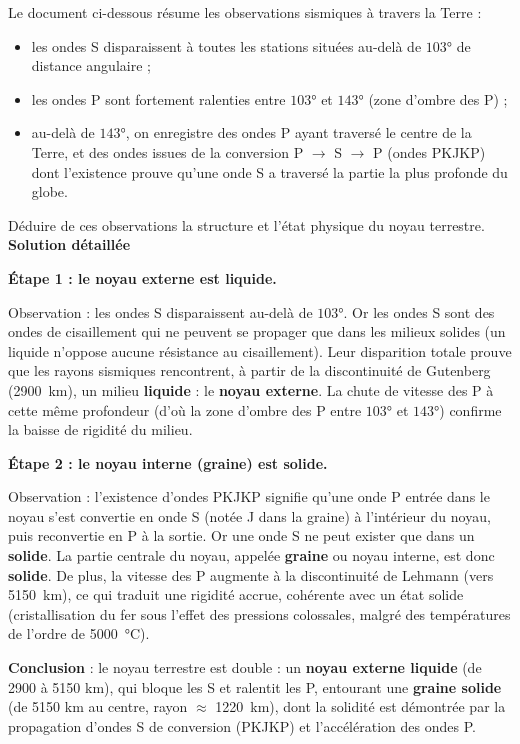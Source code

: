 \documentclass[11pt]{article}
\begin{document}
\begin{exoresolu}
Le document ci-dessous résume les observations sismiques à travers la Terre :
\begin{itemize}
\item les ondes S disparaissent à toutes les stations situées au-delà de $103°$ de distance angulaire ;
\item les ondes P sont fortement ralenties entre $103°$ et $143°$ (zone d'ombre des P) ;
\item au-delà de $143°$, on enregistre des ondes P ayant traversé le centre de la Terre, et des ondes issues de la conversion P $\to$ S $\to$ P (ondes PKJKP) dont l'existence prouve qu'une onde S a traversé la partie la plus profonde du globe.
\end{itemize}
Déduire de ces observations la structure et l'état physique du noyau terrestre.
\tcblower
\textbf{Solution détaillée}

\textbf{Étape 1 : le noyau externe est liquide.}

Observation : les ondes S disparaissent au-delà de $103°$. Or les ondes S sont des ondes de cisaillement qui ne peuvent se propager que dans les milieux solides (un liquide n'oppose aucune résistance au cisaillement). Leur disparition totale prouve que les rayons sismiques rencontrent, à partir de la discontinuité de Gutenberg (\SI{2900}{km}), un milieu \textbf{liquide} : le \textbf{noyau externe}. La chute de vitesse des P à cette même profondeur (d'où la zone d'ombre des P entre $103°$ et $143°$) confirme la baisse de rigidité du milieu.

\textbf{Étape 2 : le noyau interne (graine) est solide.}

Observation : l'existence d'ondes PKJKP signifie qu'une onde P entrée dans le noyau s'est convertie en onde S (notée J dans la graine) à l'intérieur du noyau, puis reconvertie en P à la sortie. Or une onde S ne peut exister que dans un \textbf{solide}. La partie centrale du noyau, appelée \textbf{graine} ou noyau interne, est donc \textbf{solide}. De plus, la vitesse des P augmente à la discontinuité de Lehmann (vers \SI{5150}{km}), ce qui traduit une rigidité accrue, cohérente avec un état solide (cristallisation du fer sous l'effet des pressions colossales, malgré des températures de l'ordre de \SI{5000}{\celsius}).

\textbf{Conclusion} : le noyau terrestre est double : un \textbf{noyau externe liquide} (de 2900 à 5150 km), qui bloque les S et ralentit les P, entourant une \textbf{graine solide} (de 5150 km au centre, rayon $\approx$ \SI{1220}{km}), dont la solidité est démontrée par la propagation d'ondes S de conversion (PKJKP) et l'accélération des ondes P.
\end{exoresolu}
\end{document}
